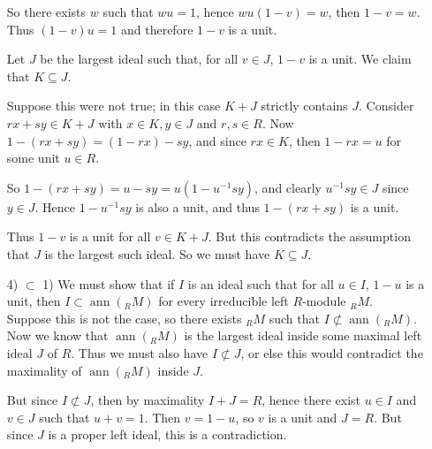 \documentclass[12pt]{article}
\begin{document}
\begin{enumerate}
      So there exists $w$ such that $wu=1$, hence $wu(1-v)=w$, then $1-v=w$.
      Thus $(1-v)u=1$ and therefore $1-v$ is a unit.

      Let $J$ be the largest ideal such that, for all $v \in J$, $1-v$ is a
      unit.  We claim that $K \subseteq J$.

      Suppose this were not true; in this case $K+J$ strictly contains $J$.
      Consider $rx+sy \in K+J$ with $x \in K, y \in J$ and $r,s \in R$.
      Now $1-(rx+sy)=(1-rx)-sy$, and since $rx \in K$, then $1-rx=u$ for some
      unit $u \in R$.

      So $1-(rx+sy)=u-sy=u(1-u^{-1}sy)$, and clearly $u^{-1}sy \in J$ since
      $y \in J$.  Hence $1-u^{-1}sy$ is also a unit, and thus $1-(rx+sy)$ is
      a unit.

      Thus $1-v$ is a unit for all $v \in K+J$.  But this contradicts the
      assumption that $J$ is the largest such ideal.  So we must have
      $K \subseteq J$.
\item [4) $\subset$ 1)] We must show that if $I$ is an ideal such that
      for all $u \in I$, $1-u$ is a unit, then
      $I \subset \operatorname{ann}({}_RM)$ for every irreducible left
      $R$-module ${}_RM$.\\

      Suppose this is not the case, so there exists ${}_RM$ such that
      $I \not \subset \operatorname{ann}({}_RM)$.  Now we know that
      $\operatorname{ann}({}_RM)$ is the largest ideal inside some maximal
      left ideal $J$ of $R$.  Thus we must also have $I \not \subset J$,
      or else this would contradict the maximality of
      $\operatorname{ann}({}_RM)$ inside $J$.

      But since $I \not \subset J$, then by maximality $I+J=R$, hence there
      exist $u \in I$ and $v \in J$ such that $u+v=1$.  Then $v=1-u$, so
      $v$ is a unit and $J=R$.  But since $J$ is a proper left ideal, this
      is a contradiction.
\end{enumerate}
\end{document}
